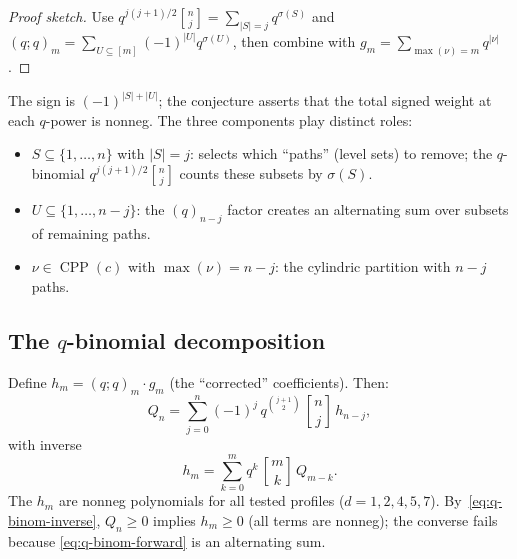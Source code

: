 \documentclass[11pt]{article}
\theoremstyle{plain}
\theoremstyle{definition}
\theoremstyle{remark}
\newcommand{\CPP}{\operatorname{CPP}}
\newcommand{\qpochn}[3]{(#1;#2)_{#3}}
\newcommand{\qbin}[2]{\genfrac{[}{]}{0pt}{}{#1}{#2}}
\begin{document}
\begin{proof}[Proof sketch]
Use $q^{j(j+1)/2}\qbin{n}{j} = \sum_{|S|=j} q^{\sigma(S)}$
and $\qpochn{q}{q}{m} = \sum_{U \subseteq [m]} (-1)^{|U|}
q^{\sigma(U)}$, then combine with $g_m = \sum_{\max(\nu)=m} q^{|\nu|}$.
\end{proof}

The sign is $(-1)^{|S|+|U|}$; the conjecture asserts that the
total signed weight at each $q$-power is nonneg.
The three components play distinct roles:
\begin{itemize}
  \item $S \subseteq \{1,\ldots,n\}$ with $|S| = j$: selects
    which ``paths'' (level sets) to remove;
    the $q$-binomial $q^{j(j+1)/2}\qbin{n}{j}$ counts these
    subsets by $\sigma(S)$.
  \item $U \subseteq \{1,\ldots,n-j\}$: the $(q)_{n-j}$ factor
    creates an alternating sum over subsets of remaining paths.
  \item $\nu \in \CPP(c)$ with $\max(\nu) = n-j$: the cylindric
    partition with $n-j$ paths.
\end{itemize}

\subsection{The $q$-binomial decomposition}

Define $h_m = \qpochn{q}{q}{m} \cdot g_m$
(the ``corrected'' coefficients). Then:
\begin{equation}\label{eq:q-binom-forward}
  Q_n = \sum_{j=0}^{n} (-1)^j\, q^{\binom{j+1}{2}}\,
    \qbin{n}{j}\, h_{n-j},
\end{equation}
with inverse
\begin{equation}\label{eq:q-binom-inverse}
  h_m = \sum_{k=0}^{m} q^k\, \qbin{m}{k}\, Q_{m-k}.
\end{equation}
The $h_m$ are nonneg polynomials for all tested profiles
($d = 1,2,4,5,7$).
By~\eqref{eq:q-binom-inverse}, $Q_n \geq 0$ implies $h_m \geq 0$
(all terms are nonneg); the converse fails because
\eqref{eq:q-binom-forward} is an alternating sum.
\end{document}

